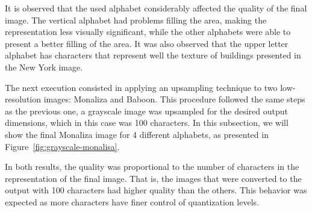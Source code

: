 \documentclass[]{IEEEtran}
\begin{document}

It is observed that the used alphabet considerably affected the quality of the final image. The vertical alphabet had problems filling the area, making the representation less visually significant, while the other alphabets were able to present a better filling of the area. It was also observed that the upper letter alphabet has characters that represent well the texture of buildings presented in the New York image.

The next execution consisted in applying an upsampling technique to two low-resolution images: Monaliza and Baboon. This procedure followed the same steps as the previous one, a grayscale image was upsampled for the desired output dimensions, which in this case was 100 characters. In this subsection, we will show the final Monaliza image for 4 different alphabets, as presented in Figure~\ref{fig:grayscale-monalisa}.


In both results, the quality was proportional to the number of characters in the representation of the final image. That is, the images that were converted to the output with 100 characters had higher quality than the others. This behavior was expected as more characters have finer control of quantization levels.
\end{document}

